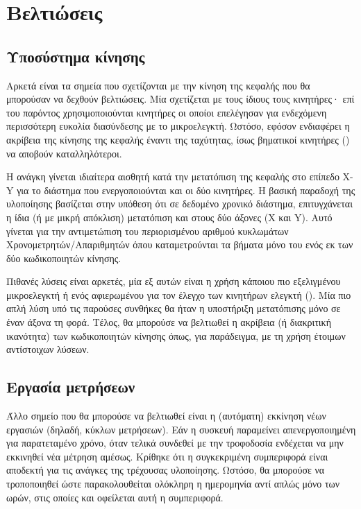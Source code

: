 \section{Βελτιώσεις}
\label{sec:improvements}

\subsection*{Υποσύστημα κίνησης}

Αρκετά είναι τα σημεία που σχετίζονται με την κίνηση της κεφαλής που θα
μπορούσαν να δεχθούν βελτιώσεις. Μία σχετίζεται με τους ίδιους τους κινητήρες·
επί του παρόντος χρησιμοποιούνται κινητήρες  οι οποίοι επελέγησαν για
ενδεχόμενη περισσότερη ευκολία διασύνδεσης με το μικροελεγκτή. Ωστόσο, εφόσον
ενδιαφέρει η ακρίβεια της κίνησης της κεφαλής έναντι της ταχύτητας, ίσως
βηματικοί κινητήρες () να αποβούν καταλληλότεροι.

Η ανάγκη γίνεται ιδιαίτερα αισθητή κατά την μετατόπιση της κεφαλής στο επίπεδο
X-Y για το διάστημα που ενεργοποιούνται και οι δύο κινητήρες. Η βασική παραδοχή
της υλοποίησης βασίζεται στην υπόθεση ότι σε δεδομένο χρονικό διάστημα,
επιτυγχάνεται η ίδια (ή με μικρή απόκλιση) μετατόπιση και στους δύο άξονες (X
και Y). Αυτό γίνεται για την αντιμετώπιση του περιορισμένου αριθμού κυκλωμάτων
Χρονομετρητών\slash{}Απαριθμητών όπου καταμετρούνται τα βήματα μόνο του ενός εκ
των δύο κωδικοποιητών κίνησης. 

Πιθανές λύσεις είναι αρκετές, μία εξ αυτών είναι η χρήση κάποιου πιο εξελιγμένου
μικροελεγκτή ή ενός αφιερωμένου για τον έλεγχο των κινητήρων ελεγκτή (). Μία πιο απλή λύση υπό τις παρούσες συνθήκες θα ήταν η υποστήριξη
μετατόπισης μόνο σε έναν άξονα τη φορά. Τέλος, θα μπορούσε να βελτιωθεί η
ακρίβεια (ή διακριτική ικανότητα) των κωδικοποιητών κίνησης όπως, για
παράδειγμα, με τη χρήση έτοιμων αντίστοιχων λύσεων.


\subsection*{Εργασία μετρήσεων}

Άλλο σημείο που θα μπορούσε να βελτιωθεί είναι η (αυτόματη) εκκίνηση νέων
εργασιών (δηλαδή, κύκλων μετρήσεων).
Εάν η συσκευή παραμείνει απενεργοποιημένη για παρατεταμένο χρόνο, όταν τελικά
συνδεθεί με την τροφοδοσία ενδέχεται να μην εκκινηθεί νέα μέτρηση αμέσως.
Κρίθηκε ότι η συγκεκριμένη συμπεριφορά είναι αποδεκτή για τις ανάγκες της
τρέχουσας υλοποίησης. Ωστόσο, θα μπορούσε να τροποποιηθεί ώστε παρακολουθείται
ολόκληρη η ημερομηνία αντί απλώς μόνο των ωρών, στις οποίες και οφείλεται αυτή
η συμπεριφορά.

